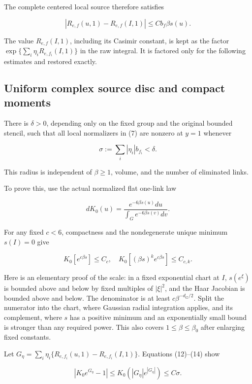\documentclass[
  11pt,
]{article}
\begin{document}
The complete centered local source therefore satisfies

\[
 |R_{e,f}(u,1)-R_{e,f}(I,1)|\le Cb_f\beta s(u).
                                                        \tag{12}
\]

The value \(R_{e,f}(I,1)\), including its Casimir constant, is kept as
the factor \(\exp\{\sum_i\eta_iR_{e,f_i}(I,1)\}\) in the raw integral.
It is factored only for the following estimates and restored exactly.

\hypertarget{uniform-complex-source-disc-and-compact-moments}{%
\subsection{Uniform complex source disc and compact
moments}\label{uniform-complex-source-disc-and-compact-moments}}

There is \(\delta>0\), depending only on the fixed group and the
original bounded stencil, such that all local normalizers in (7) are
nonzero at \(y=1\) whenever

\[
 \sigma:=\sum_i|\eta_i|b_{f_i}<\delta.             \tag{13}
\]

This radius is independent of \(\beta\ge1\), volume, and the number of
eliminated links.

To prove this, use the actual normalized flat one-link law

\[
 dK_0(u)=\frac{e^{-6\beta s(u)}du}{\int_Ge^{-6\beta s(v)}dv}.
\]

For any fixed \(c<6\), compactness and the nondegenerate unique minimum
\(s(I)=0\) give

\[
 K_0[e^{c\beta s}]\le C_c,
 \quad K_0[(\beta s)^k e^{c\beta s}]\le C_{c,k}.     \tag{14}
\]

Here is an elementary proof of the scale: in a fixed exponential chart
at \(I\), \(s(e^\xi)\) is bounded above and below by fixed multiples of
\(|\xi|^2\), and the Haar Jacobian is bounded above and below. The
denominator is at least \(c\beta^{-d_G/2}\). Split the numerator into
the chart, where Gaussian radial integration applies, and its
complement, where \(s\) has a positive minimum and an exponentially
small bound is stronger than any required power. This also covers
\(1\le\beta\le\beta_0\) after enlarging fixed constants.

Let \(G_\eta=\sum_i\eta_i\{R_{e,f_i}(u,1)-R_{e,f_i}(I,1)\}\). Equations
(12)--(14) show

\[
 |K_0e^{G_\eta}-1|
 \le K_0(|G_\eta|e^{|G_\eta|})\le C\sigma.
\]
\end{document}
